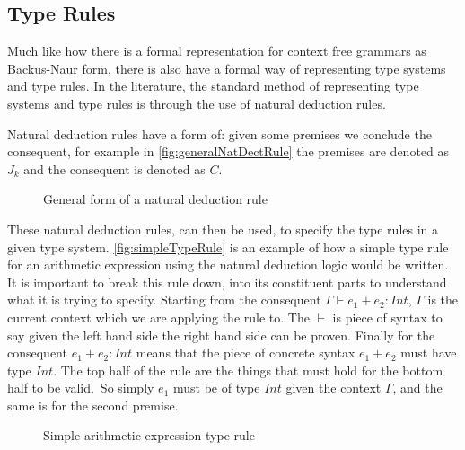 \subsection{Type Rules}
Much like how there is a formal representation for context free grammars as Backus-Naur form\cite{Backus1960,aho2003compilers,ranta2012implementing}, there is also have a formal way of representing type systems and type rules.
In the literature, the standard method of representing type systems and type rules is through the use of natural deduction rules\cite{cardelli1996type,ranta2012implementing}.

Natural deduction rules have a form of: given some premises we conclude the consequent\cite{prawitz2006natural,ranta2012implementing}, for example in \autoref{fig:generalNatDectRule} the premises are denoted as $J_k$ and the consequent is denoted as $C$.

\begin{figure}[tbp]
    \begin{prooftree}
    \end{prooftree}
    \caption{General form of a natural deduction rule}
    \label{fig:generalNatDectRule}
\end{figure}

These natural deduction rules, can then be used, to specify the type rules in a given type system\cite{ranta2012implementing,cardelli1996type}.
\autoref{fig:simpleTypeRule} is an example of how a simple type rule for an arithmetic expression using the natural deduction logic would be written.
It is important to break this rule down, into its constituent parts to understand what it is trying to specify.
Starting from the consequent $\Gamma \vdash e_1 + e_2 : Int$, $\Gamma$ is the current context which we are applying the rule to.
The $\vdash$ is piece of syntax to say given the left hand side the right hand side can be proven.
Finally for the consequent $e_1 + e_2 : Int$ means that the piece of concrete syntax $e_1 + e_2$ must have type $Int$.
The top half of the rule are the things that must hold for the bottom half to be valid.\
So simply $e_1$ must be of type $Int$ given the context $\Gamma$, and the same is for the second premise\cite{cardelli1996type,ranta2012implementing}.

\begin{figure}[tbp]
    \begin{prooftree}
    \end{prooftree}
    \caption{Simple arithmetic expression type rule}
    \label{fig:simpleTypeRule}
\end{figure}